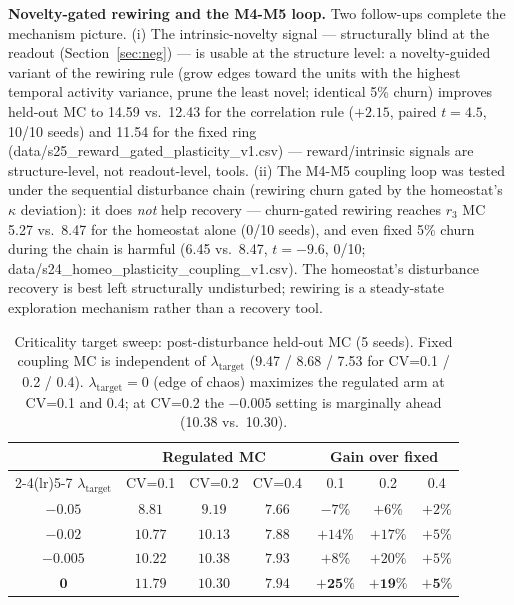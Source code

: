 \documentclass[11pt]{article}
\begin{document}
\textbf{Novelty-gated rewiring and the M4-M5 loop.} Two follow-ups complete the
mechanism picture. (i) The intrinsic-novelty signal --- structurally blind at
the readout (Section~\ref{sec:neg}) --- is usable at the structure level: a
novelty-guided variant of the rewiring rule (grow edges toward the units with
the highest temporal activity variance, prune the least novel; identical 5\%
churn) improves held-out MC to 14.59 vs.\ 12.43 for the correlation rule
($+2.15$, paired $t=4.5$, 10/10 seeds) and 11.54 for the fixed ring
(data/s25\_reward\_gated\_plasticity\_v1.csv) --- reward/intrinsic signals are
structure-level, not readout-level, tools. (ii) The M4-M5 coupling loop was
tested under the sequential disturbance chain (rewiring churn gated by the
homeostat's $\kappa$ deviation): it does \emph{not} help recovery ---
churn-gated rewiring reaches $r_3$ MC 5.27 vs.\ 8.47 for the homeostat alone
(0/10 seeds), and even fixed 5\% churn during the chain is harmful (6.45 vs.\
8.47, $t=-9.6$, 0/10; data/s24\_homeo\_plasticity\_coupling\_v1.csv). The
homeostat's disturbance recovery is best left structurally undisturbed;
rewiring is a steady-state exploration mechanism rather than a recovery tool.

\begin{table}[t]
\centering
\caption{Criticality target sweep: post-disturbance held-out MC (5 seeds).
Fixed coupling MC is independent of $\lambda_{\mathrm{target}}$
(9.47 / 8.68 / 7.53 for CV=0.1 / 0.2 / 0.4).
$\lambda_{\mathrm{target}}=0$ (edge of chaos) maximizes the regulated arm
at CV=0.1 and 0.4; at CV=0.2 the $-0.005$ setting is marginally ahead
(10.38 vs.\ 10.30).}
\label{tab:lambda_sweep}
\begin{tabular}{ccccccc}
\toprule
& \multicolumn{3}{c}{Regulated MC} & \multicolumn{3}{c}{Gain over fixed} \\
\cmidrule(lr){2-4}\cmidrule(lr){5-7}
$\lambda_{\mathrm{target}}$ & CV=0.1 & CV=0.2 & CV=0.4 & 0.1 & 0.2 & 0.4 \\
\midrule
$-0.05$ & $8.81$ & $9.19$ & $7.66$ & $-7\%$ & $+6\%$ & $+2\%$ \\
$-0.02$ & $10.77$ & $10.13$ & $7.88$ & $+14\%$ & $+17\%$ & $+5\%$ \\
$-0.005$ & $10.22$ & $10.38$ & $7.93$ & $+8\%$ & $+20\%$ & $+5\%$ \\
$\mathbf{0}$ & $\mathbf{11.79}$ & $\mathbf{10.30}$ & $\mathbf{7.94}$ & $\mathbf{+25\%}$ & $\mathbf{+19\%}$ & $\mathbf{+5\%}$ \\
\bottomrule
\end{tabular}
\end{table}
\end{document}
